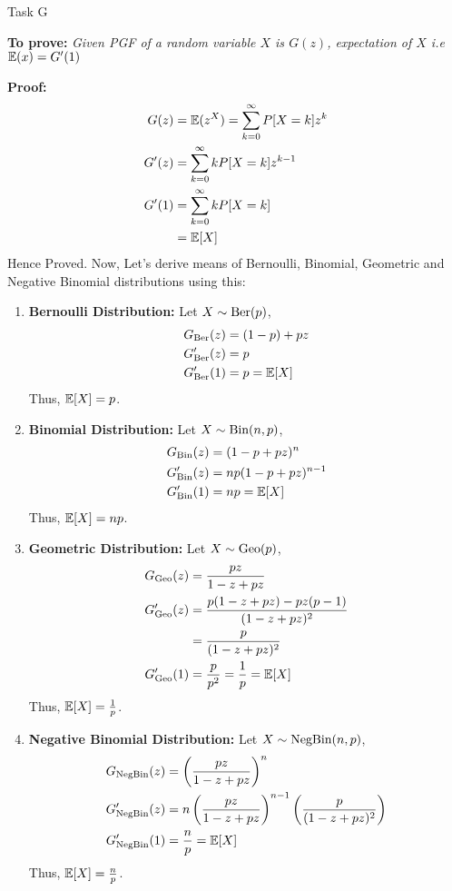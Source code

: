 \begin{task}{ Task G }

	\textbf{To prove:} \textit{Given PGF of a random variable $X$ is
		$G(z)$, expectation of $X$ i.e $\mathbb{E}(x) = G'(1)$}

	\textbf{Proof:} \begin{align}
		G(z)  & = \mathbb{E}(z^X) = \sum_{k=0}^\infty P[X=k]z^k \\
		G'(z) & = \sum_{k=0}^\infty kP[X=k]z^{k-1}      \\
		G'(1) & = \sum_{k=0}^\infty kP[X=k]             \\
		      & = \mathbb{E}[X]
	\end{align}
	Hence Proved.
	Now, Let's derive means of Bernoulli, Binomial, Geometric and Negative Binomial
	distributions using this:
	\begin{enumerate}
		\item \textbf{Bernoulli Distribution:} Let $X\sim\text{Ber}(p)$,
		      \begin{align}
			      G_{\text{Ber}}(z)  & = (1-p) + pz \\
			      G'_{\text{Ber}}(z) & = p          \\
			      G'_{\text{Ber}}(1) & = p = \mathbb{E}[X]
		      \end{align}
		      Thus, $\mathbb{E}[X] = p$.
		\item \textbf{Binomial Distribution:} Let $X\sim\text{Bin}(n,p)$,
		      \begin{align}
			      G_{\text{Bin}}(z)  & = (1-p + pz)^n       \\
			      G'_{\text{Bin}}(z) & = np(1-p + pz)^{n-1} \\
			      G'_{\text{Bin}}(1) & = np = \mathbb{E}[X]
		      \end{align}
		      Thus, $\mathbb{E}[X] = np$.
		\item \textbf{Geometric Distribution:} Let $X\sim\text{Geo}(p)$,
		      \begin{align}
			      G_{\text{Geo}}(z)  & = \frac{pz}{1-z+pz}                      \\
			      G'_{\text{Geo}}(z) & = \frac{p(1-z+pz) - pz(p-1)}{(1-z+pz)^2} \\
			                 & = \frac{p}{(1-z+pz)^2}                   \\
			      G'_{\text{Geo}}(1) & = \frac{p}{p^2} = \frac{1}{p} = \mathbb{E}[X]
		      \end{align}
		      Thus, $\mathbb{E}[X] = \frac{1}{p}$.
		\item \textbf{Negative Binomial Distribution:} Let $X\sim\text{NegBin}(n,p)$,
		      \begin{align}
			      G_{\text{NegBin}}(z)  & = \left( \frac{pz}{1-z+pz} \right)^n \\
			      G'_{\text{NegBin}}(z) & = n\left( \frac{pz}{1-z+pz}
			      \right)^{n-1}\left(\frac{p}{(1-z+pz)^2}\right)       \\
			      G'_{\text{NegBin}}(1) & = \frac{n}{p} = \mathbb{E}[X]
		      \end{align}
		      Thus, $\mathbb{E}[X] = \frac{n}{p}$.
	\end{enumerate}

\end{task}
